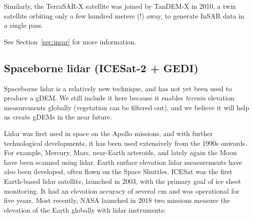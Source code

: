Similarly, the TerraSAR-X satellite was joined by TanDEM-X in 2010, a twin satellite orbiting only a few hundred meters (!) away, to generate InSAR data in a single pass.

See Section~\ref{sec:insar} for more information.


\subsection{Spaceborne lidar (ICESat-2 + GEDI)}%

Spaceborne lidar is a relatively new technique, and has not yet been used to produce a gDEM\@.
We still include it here because it enables \emph{terrain} elevation measurements globally (vegetation can be filtered out), and we believe it will help us create gDEMs in the near future.

%

Lidar was first used in space on the Apollo missions, and with further technological developments, it has been used extensively from the 1990s onwards.
For example, Mercury, Mars, near-Earth asteroids, and lately again the Moon have been scanned using lidar.
Earth surface elevation lidar measurements have also been developed, often flown on the Space Shuttles.
ICESat was the first Earth-based lidar satellite, launched in 2003, with the primary goal of ice sheet monitoring.
It had an elevation accuracy of several cm and was operational for five years.
Most recently, NASA launched in 2018 two missions measure the elevation of the Earth globally with lidar instruments:


